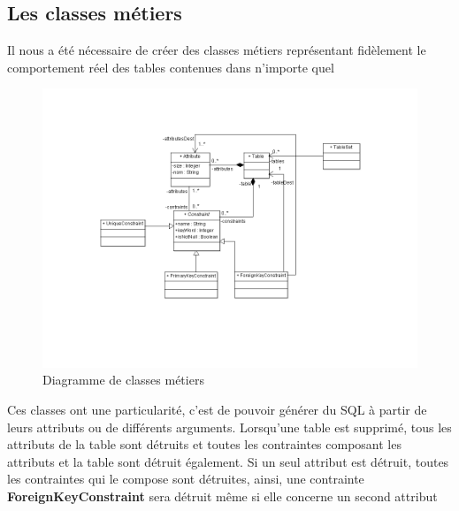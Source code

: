 \subsection{Les classes métiers}
Il nous a été nécessaire de créer des classes métiers représentant fidèlement le comportement réel des tables contenues dans n'importe quel \sgbd

\begin{figure}[!h]
\centering
\includegraphics[width=13cm]{images/metier.png}
\caption{Diagramme de classes métiers}
\label{classes_metiers}
\end{figure}


Ces classes ont une particularité, c'est de pouvoir générer du SQL à partir de leurs attributs ou de différents arguments.
Lorsqu'une table est supprimé, tous les attributs de la table sont détruits et toutes les contraintes composant les attributs et la table sont détruit également.
Si un seul attribut est détruit, toutes les contraintes qui le compose sont détruites, ainsi, une contrainte \textbf{ForeignKeyConstraint} sera détruit même si elle concerne un second attribut
